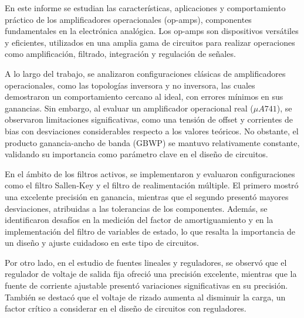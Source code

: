 En este informe se estudian las características, aplicaciones y comportamiento práctico de los amplificadores operacionales (op-amps), componentes fundamentales en la electrónica analógica. Los op-amps son dispositivos versátiles y eficientes, utilizados en una amplia gama de circuitos para realizar operaciones como amplificación, filtrado, integración y regulación de señales.

A lo largo del trabajo, se analizaron configuraciones clásicas de amplificadores operacionales, como las topologías inversora y no inversora, las cuales demostraron un comportamiento cercano al ideal, con errores mínimos en sus ganancias. Sin embargo, al evaluar un amplificador operacional real ($\mu A741$), se observaron limitaciones significativas, como una tensión de offset y corrientes de bias con desviaciones considerables respecto a los valores teóricos. No obstante, el producto ganancia-ancho de banda (GBWP) se mantuvo relativamente constante, validando su importancia como parámetro clave en el diseño de circuitos.

En el ámbito de los filtros activos, se implementaron y evaluaron configuraciones como el filtro Sallen-Key y el filtro de realimentación múltiple. El primero mostró una excelente precisión en ganancia, mientras que el segundo presentó mayores desviaciones, atribuidas a las tolerancias de los componentes. Además, se identificaron desafíos en la medición del factor de amortiguamiento y en la implementación del filtro de variables de estado, lo que resalta la importancia de un diseño y ajuste cuidadoso en este tipo de circuitos.

Por otro lado, en el estudio de fuentes lineales y reguladores, se observó que el regulador de voltaje de salida fija ofreció una precisión excelente, mientras que la fuente de corriente ajustable presentó variaciones significativas en su precisión. También se destacó que el voltaje de rizado aumenta al disminuir la carga, un factor crítico a considerar en el diseño de circuitos con reguladores.